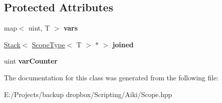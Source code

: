 \subsection*{Protected Attributes}
\begin{DoxyCompactItemize}
\item 
\hypertarget{a00021_a553590dc3eebc70ce33fae77071ae56d}{map$<$ uint, T $>$ {\bfseries vars}}\label{a00021_a553590dc3eebc70ce33fae77071ae56d}

\item 
\hypertarget{a00021_a106e1a4efffa0b54e5ef618950eeeb69}{\hyperlink{a00022}{Stack}$<$ \hyperlink{a00021}{Scope\+Type}$<$ T $>$ $\ast$ $>$ {\bfseries joined}}\label{a00021_a106e1a4efffa0b54e5ef618950eeeb69}

\item 
\hypertarget{a00021_acf681b9026dcc2deb745ebeb1baf656a}{uint {\bfseries var\+Counter}}\label{a00021_acf681b9026dcc2deb745ebeb1baf656a}

\end{DoxyCompactItemize}


The documentation for this class was generated from the following file\+:\begin{DoxyCompactItemize}
\item 
E\+:/\+Projects/backup dropbox/\+Scripting/\+Aiki/Scope.\+hpp\end{DoxyCompactItemize}
